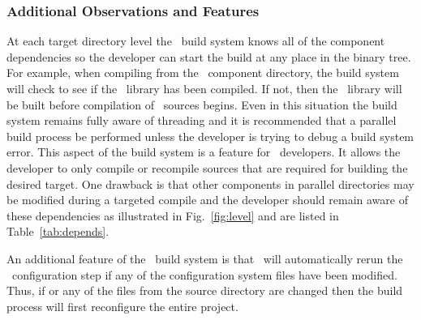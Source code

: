 \subsubsection{Additional Observations and Features}

At each target directory level the \draco\ build system knows all of the component
dependencies so the developer can start the build at any place in the binary tree. 
For example, when compiling from the \cfour\ component directory, the build system will check to see if the \dsxx\ library has been compiled.  
If not, then the \dsxx\ library will be built before compilation of \cfour\ sources begins.  
Even in this situation the build system remains fully aware of threading and it is recommended that a parallel build process be performed unless the developer 
is trying to debug a build system error.   
This aspect of the build system is a feature for \draco\ developers.  
It allows the developer to only compile or recompile sources that are required for building the desired target.  
One drawback is that other components in parallel directories may be modified during a targeted compile and the developer should remain aware of 
these dependencies as  illustrated in Fig.~\ref{fig:level} and are listed in Table~\ref{tab:depends}.
%


An additional feature of the \draco\ build system is that \draco\ will automatically rerun the \cmake\ configuration step if any of the configuration system files have been modified.  
Thus, if  or any of the files from the  source directory are changed then the build process will first reconfigure the entire project.  

